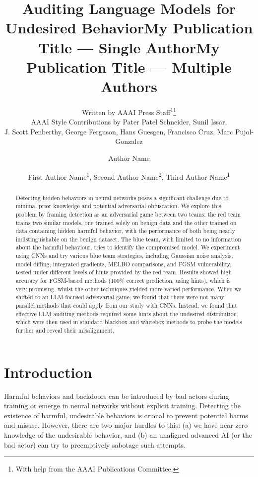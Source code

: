 \documentclass[letterpaper]{article} %
\title{Auditing Language Models for Undesired Behavior}
\author{
    Written by AAAI Press Staff\textsuperscript{\rm 1}\thanks{With help from the AAAI Publications Committee.}\\
    AAAI Style Contributions by Pater Patel Schneider,
    Sunil Issar,\\
    J. Scott Penberthy,
    George Ferguson,
    Hans Guesgen,
    Francisco Cruz\equalcontrib,
    Marc Pujol-Gonzalez\equalcontrib
}
\title{My Publication Title --- Single Author}
\author {
    Author Name
}
\title{My Publication Title --- Multiple Authors}
\author {
    First Author Name\textsuperscript{\rm 1},
    Second Author Name\textsuperscript{\rm 2},
    Third Author Name\textsuperscript{\rm 1}
}
\begin{document}
\maketitle

\begin{abstract}
Detecting hidden behaviors in neural networks poses a significant challenge due to minimal prior knowledge and potential adversarial obfuscation. We explore this problem by framing detection as an adversarial game between two teams: the red team trains two similar models, one trained solely on benign data and the other trained on data containing hidden harmful behavior, with the performance of both being nearly indistinguishable on the benign dataset. The blue team, with limited to no information about the harmful behaviour, tries to identify the compromised model. We experiment using CNNs and try various blue team strategies, including Gaussian noise analysis, model diffing, integrated gradients, MELBO comparisons, and FGSM vulnerability, tested under different levels of hints provided by the red team. Results showed high accuracy for FGSM-based methods (100\% correct prediction, using hints), which is very promising, whilst the other techniques yielded more varied performance. When we shifted to an LLM-focused adversarial game, we found that there were not many parallel methods that could apply from our study with CNNs. Instead, we found that effective LLM auditing methods required some hints about the undesired distribution, which were then used in standard blackbox and whitebox methods to probe the models further and reveal their misalignment.
\end{abstract}

%

\section{Introduction}
Harmful behaviors and backdoors can be introduced by bad actors during training or emerge in neural networks without explicit training. Detecting the existence of harmful, undesirable behaviors is crucial to prevent potential harms and misuse. However, there are two major hurdles to this: (a) we have near-zero knowledge of the undesirable behavior, and (b) an unaligned advanced AI (or the bad actor) can try to preemptively sabotage such attempts.
\end{document}
